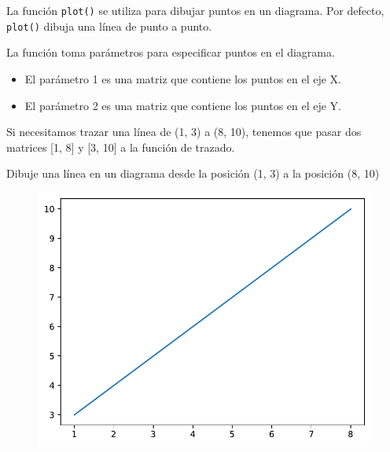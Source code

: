 La función \texttt{plot()} se utiliza para dibujar puntos en un
diagrama. Por defecto, \texttt{plot()} dibuja una línea de punto a
punto.

La función toma parámetros para especificar puntos en el diagrama.

\begin{itemize}
  \item El parámetro 1 es una matriz que contiene los puntos en el eje X.
  \item El parámetro 2 es una matriz que contiene los puntos en el eje Y.
\end{itemize}

Si necesitamos trazar una línea de (1, 3) a (8, 10), tenemos que pasar
dos matrices {[}1, 8{]} y {[}3, 10{]} a la función de trazado.\\

\begin{code} Dibuje una línea en un diagrama desde la posición (1, 3) a la posición (8, 10)

\begin{Shaded}
\begin{Highlighting}[]

\OperatorTok{=}\NormalTok{ np.array([}\NormalTok{, }\NormalTok{])}
\OperatorTok{=}\NormalTok{ np.array([}\NormalTok{, }\NormalTok{])}

\end{Highlighting}
\end{Shaded}

\begin{figure}
  \centering
  \includegraphics[scale=0.6]{img/grafica1002.pdf}
\end{figure}

\end{code}

